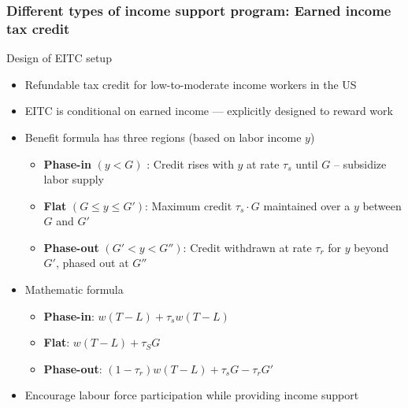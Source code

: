 \documentclass[aspectratio=169]{beamer}
\begin{document}
\begin{frame}
\frametitle{Different types of income support program: Earned income tax credit} 
Design of EITC setup
\begin{itemize}\setlength\itemsep{3pt}
    \item Refundable tax credit for low-to-moderate income
    workers in the US
    \item EITC is conditional
    on earned income --- explicitly designed to reward work
    \item Benefit formula has three regions (based on labor income $y$)
    \begin{itemize}\setlength\itemsep{3pt}
        \item \textbf{Phase-in} $(y<G)$ : Credit rises with $y$ at rate $\tau_s$ until $G$ -- subsidize labor supply
        \item \textbf{Flat} $(G\leq y \leq G')$: Maximum credit $\tau_s \cdot G$ maintained over a $y$ between $G$ and $G'$
        \item \textbf{Phase-out} $(G'<y<G'')$: Credit withdrawn at rate $\tau_r$ for $y$ beyond $G'$, phased out at $G''$
    \end{itemize}
    \item Mathematic formula
        \begin{itemize}\setlength\itemsep{3pt}
        \item \textbf{Phase-in}: $w(T-L)+\tau_s w (T-L)$
        \item \textbf{Flat}: $w(T-L)+\tau_S G$
        \item \textbf{Phase-out}: $(1-\tau_r)w(T-L)+\tau_s G -\tau_r G'$
    \end{itemize}
    \item Encourage labour force participation while providing income support 
\end{itemize}
\end{frame}
\end{document}
